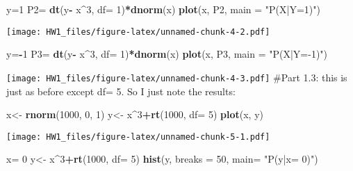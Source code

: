 \documentclass[]{article}
\newenvironment{Shaded}{\begin{snugshade}}{\end{snugshade}}
\newcommand{\DataTypeTok}[1]{\textcolor[rgb]{0.13,0.29,0.53}{#1}}
\newcommand{\DecValTok}[1]{\textcolor[rgb]{0.00,0.00,0.81}{#1}}
\newcommand{\KeywordTok}[1]{\textcolor[rgb]{0.13,0.29,0.53}{\textbf{#1}}}
\newcommand{\NormalTok}[1]{#1}
\newcommand{\OperatorTok}[1]{\textcolor[rgb]{0.81,0.36,0.00}{\textbf{#1}}}
\newcommand{\StringTok}[1]{\textcolor[rgb]{0.31,0.60,0.02}{#1}}
\begin{document}
\begin{Shaded}
\begin{Highlighting}[]
\NormalTok{y=}\DecValTok{1}
\NormalTok{P2=}\StringTok{ }\KeywordTok{dt}\NormalTok{(y}\OperatorTok{-}\StringTok{ }\NormalTok{x}\OperatorTok{^}\DecValTok{3}\NormalTok{, }\DataTypeTok{df=} \DecValTok{1}\NormalTok{)}\OperatorTok{*}\KeywordTok{dnorm}\NormalTok{(x)}
\KeywordTok{plot}\NormalTok{(x, P2, }\DataTypeTok{main =} \StringTok{"P(X|Y=1)"}\NormalTok{)}
\end{Highlighting}
\end{Shaded}

\texttt{[image: HW1\_files/figure-latex/unnamed-chunk-4-2.pdf]}

\begin{Shaded}
\begin{Highlighting}[]
\NormalTok{y=}\OperatorTok{-}\DecValTok{1}
\NormalTok{P3=}\StringTok{ }\KeywordTok{dt}\NormalTok{(y}\OperatorTok{-}\StringTok{ }\NormalTok{x}\OperatorTok{^}\DecValTok{3}\NormalTok{, }\DataTypeTok{df=} \DecValTok{1}\NormalTok{)}\OperatorTok{*}\KeywordTok{dnorm}\NormalTok{(x)}
\KeywordTok{plot}\NormalTok{(x, P3, }\DataTypeTok{main =} \StringTok{"P(X|Y=-1)"}\NormalTok{)}
\end{Highlighting}
\end{Shaded}

\texttt{[image: HW1\_files/figure-latex/unnamed-chunk-4-3.pdf]} \#Part
1.3: this is just as before except df= 5. So I just note the results:

\begin{Shaded}
\begin{Highlighting}[]
\NormalTok{x<-}\StringTok{ }\KeywordTok{rnorm}\NormalTok{(}\DecValTok{1000}\NormalTok{, }\DecValTok{0}\NormalTok{, }\DecValTok{1}\NormalTok{)}
\NormalTok{y<-}\StringTok{ }\NormalTok{x}\OperatorTok{^}\DecValTok{3}\OperatorTok{+}\KeywordTok{rt}\NormalTok{(}\DecValTok{1000}\NormalTok{, }\DataTypeTok{df=} \DecValTok{5}\NormalTok{)}
\KeywordTok{plot}\NormalTok{(x, y)}
\end{Highlighting}
\end{Shaded}

\texttt{[image: HW1\_files/figure-latex/unnamed-chunk-5-1.pdf]}

\begin{Shaded}
\begin{Highlighting}[]
\NormalTok{x=}\StringTok{ }\DecValTok{0}
\NormalTok{y<-}\StringTok{ }\NormalTok{x}\OperatorTok{^}\DecValTok{3}\OperatorTok{+}\KeywordTok{rt}\NormalTok{(}\DecValTok{1000}\NormalTok{, }\DataTypeTok{df=} \DecValTok{5}\NormalTok{)}
\KeywordTok{hist}\NormalTok{(y, }\DataTypeTok{breaks =}  \DecValTok{50}\NormalTok{, }\DataTypeTok{main=} \StringTok{"P(y|x= 0)"}\NormalTok{)}
\end{Highlighting}
\end{Shaded}
\end{document}
